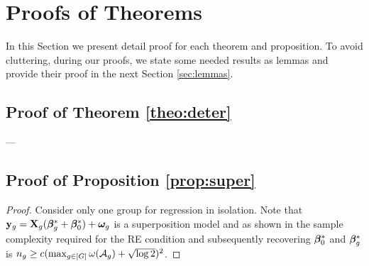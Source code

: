 \newpage 
\onecolumn
\section{Proofs of Theorems}
\label{sec:dsproofs}
In this Section we present detail proof for each theorem and proposition. To avoid cluttering, during our proofs, we state some needed results as lemmas and provide their proof in the next Section \ref{sec:lemmas}. 

\subsection{Proof of Theorem \ref{theo:deter}}
---

\subsection{Proof of Proposition \ref{prop:super}}
\begin{proof}
	Consider only one group for regression in isolation. 
	Note that $\mathbf{y}_g = \mathbf{X}_g (\boldsymbol{\beta} _g^* + \boldsymbol{\beta} _0^*) + \boldsymbol{\omega}_g$ is a superposition model and as shown in \cite{guba16} the sample complexity required for the RE condition and subsequently recovering $\boldsymbol{\beta} _0^*$ and $\boldsymbol{\beta} _g^*$ is $n_g  \geq c(\max_{g \in [G]}\omega(\cA_g) + \sqrt{\log 2})^2$.
\end{proof} 


